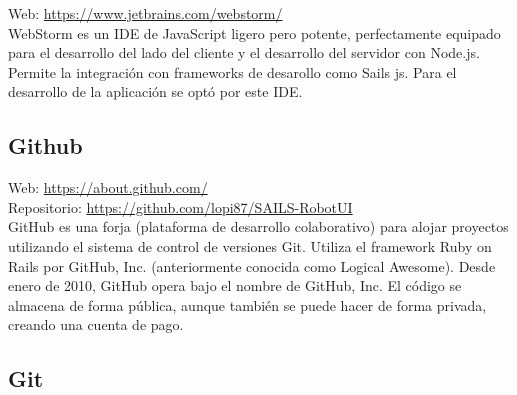 Web: \url{https://www.jetbrains.com/webstorm/}\\

WebStorm es un IDE de JavaScript ligero pero potente, perfectamente equipado para el desarrollo del lado del cliente y el desarrollo del servidor con Node.js. Permite la integración con frameworks de desarollo como Sails js. Para el desarrollo de la aplicación se optó por este IDE. \\

\subsection{Github}



Web: \url{https://about.github.com/} \cite{website:4} \\
Repositorio: \url{https://github.com/lopi87/SAILS-RobotUI}\\


GitHub es una forja (plataforma de desarrollo colaborativo) para alojar proyectos utilizando el sistema de control de versiones Git. Utiliza el framework Ruby on Rails por GitHub, Inc. (anteriormente conocida como Logical Awesome). Desde enero de 2010, GitHub opera bajo el nombre de GitHub, Inc. El código se almacena de forma pública, aunque también se puede hacer de forma privada, creando una cuenta de pago.


\subsection{Git}


